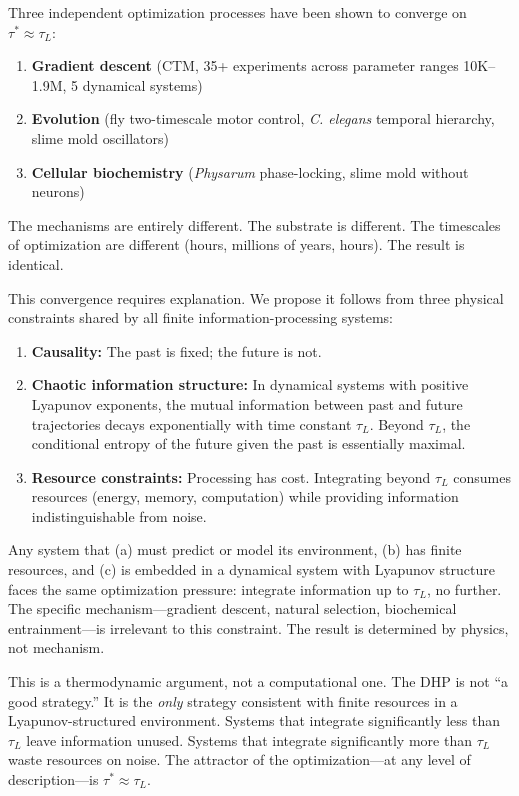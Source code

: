 \documentclass[12pt]{article}
\begin{document}
Three independent optimization processes have been shown to converge on $\tau^* \approx
\tau_L$:

\begin{enumerate}
  \item \textbf{Gradient descent} (CTM, 35+ experiments across parameter ranges
        10K--1.9M, 5 dynamical systems)
  \item \textbf{Evolution} (fly two-timescale motor control, \textit{C. elegans}
        temporal hierarchy, slime mold oscillators)
  \item \textbf{Cellular biochemistry} (\textit{Physarum} phase-locking, slime mold
        without neurons)
\end{enumerate}

The mechanisms are entirely different. The substrate is different. The timescales of
optimization are different (hours, millions of years, hours). The result is identical.

This convergence requires explanation. We propose it follows from three physical constraints
shared by all finite information-processing systems:

\begin{enumerate}
  \item \textbf{Causality:} The past is fixed; the future is not.
  \item \textbf{Chaotic information structure:} In dynamical systems with positive
        Lyapunov exponents, the mutual information between past and future trajectories
        decays exponentially with time constant $\tau_L$. Beyond $\tau_L$, the conditional
        entropy of the future given the past is essentially maximal.
  \item \textbf{Resource constraints:} Processing has cost. Integrating beyond $\tau_L$
        consumes resources (energy, memory, computation) while providing information
        indistinguishable from noise.
\end{enumerate}

Any system that (a) must predict or model its environment, (b) has finite resources, and
(c) is embedded in a dynamical system with Lyapunov structure faces the same optimization
pressure: integrate information up to $\tau_L$, no further. The specific mechanism---gradient
descent, natural selection, biochemical entrainment---is irrelevant to this constraint. The
result is determined by physics, not mechanism.

This is a thermodynamic argument, not a computational one. The DHP is not ``a good
strategy.'' It is the \emph{only} strategy consistent with finite resources in a
Lyapunov-structured environment. Systems that integrate significantly less than $\tau_L$
leave information unused. Systems that integrate significantly more than $\tau_L$ waste
resources on noise. The attractor of the optimization---at any level of description---is
$\tau^* \approx \tau_L$.
\end{document}
